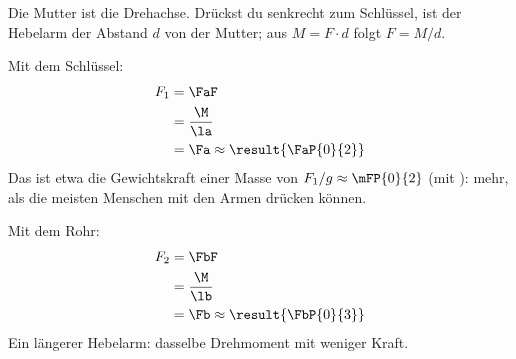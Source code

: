 Die Mutter ist die Drehachse. Drückst du senkrecht zum Schlüssel, ist der Hebelarm der Abstand $d$ von der Mutter; aus $M = F\cdot d$ folgt $F = M/d$.

\begin{abcliste}
\abc
Mit dem Schlüssel:
\begin{align}
 F_1 &= \FaF \\
   &= \frac{\M}{\la} \\
   &= \Fa \approx \result{\FaP{0}{2}}
\end{align}
Das ist etwa die Gewichtskraft einer Masse von $F_1/g \approx \mFP{0}{2}$ (mit \gO): mehr, als die meisten Menschen mit den Armen drücken können.

\abc
Mit dem Rohr:
\begin{align}
 F_2 &= \FbF \\
   &= \frac{\M}{\lb} \\
   &= \Fb \approx \result{\FbP{0}{3}}
\end{align}
Ein längerer Hebelarm: dasselbe Drehmoment mit weniger Kraft.
\end{abcliste}
